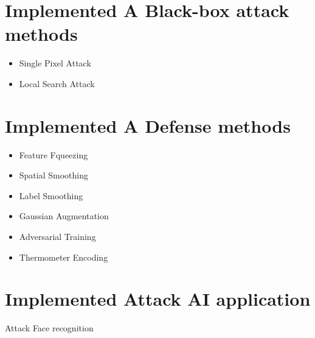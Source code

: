 \documentclass{article}
\begin{document}
\section{Implemented A Black-box attack methods}

\begin{itemize}
\item Single Pixel Attack 
\item Local Search Attack
\end{itemize}

\section{Implemented A Defense methods}

\begin{itemize}
\item Feature Fqueezing 
\item Spatial Smoothing 
\item Label Smoothing 
\item Gaussian Augmentation 
\item Adversarial Training
\item Thermometer Encoding
\end{itemize}

\section{Implemented Attack AI application}
Attack Face recognition




\end{document}
